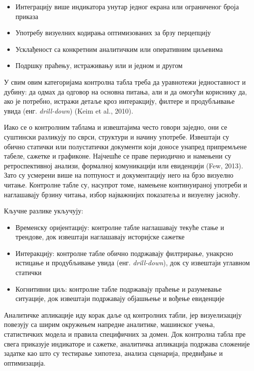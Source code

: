 \begin{itemize}
  \item Интеграцију више индикатора унутар једног екрана или ограниченог броја приказа
  \item Употребу визуелних кодирања оптимизованих за брзу перцепцију
  \item Усклађеност са конкретним аналитичким или оперативним циљевима
  \item Подршку праћењу, истраживању или и једном и другом
\end{itemize}
У свим овим категоријама контролна табла треба да уравнотежи једноставност и дубину: да одмах да одговор на основна питања, али и да омогући кориснику да, ако је потребно, истражи детаље кроз интеракцију, филтере и продубљивање увида (енг. \textit{drill-down}) (Keim et al., 2010).

Иако се о контролним таблама и извештајима често говори заједно, они се суштински разликују по сврси, структури и начину употребе. Извештаји су обично статички или полустатички документи који доносе унапред припремљене табеле, сажетке и графиконе. Најчешће се праве периодично и намењени су ретроспективној анализи, формалној комуникацији или евиденцији (Few, 2013). Зато су усмерени више на потпуност и документацију него на брзо визуелно читање. Контролне табле су, насупрот томе, намењене континуираној употреби и наглашавају брзину читања, избор најважнијих показатеља и визуелну јасноћу. 

Кључне разлике укључују:

\begin{itemize}
  \item Временску оријентацију: контролне табле наглашавају текуће стање и трендове, док извештаји наглашавају историјске сажетке
  \item Интеракцију: контролне табле обично подржавају филтрирање, унакрсно истицање и продубљивање увида (енг. \textit{drill-down}), док су извештаји углавном статички
  \item Когнитивни циљ: контролне табле подржавају праћење и разумевање ситуације, док извештаји подржавају објашњење и вођење евиденције
\end{itemize}
Аналитичке апликације иду корак даље од контролних табли, јер визуелизацију повезују са ширим окружењем напредне аналитике, машинског учења, статистичких модела и правила специфичних за домен. Док контролна табла пре свега приказује индикаторе и сажетке, аналитичка апликација подржава сложеније задатке као што су тестирање хипотеза, анализа сценарија, предвиђање и оптимизација.


